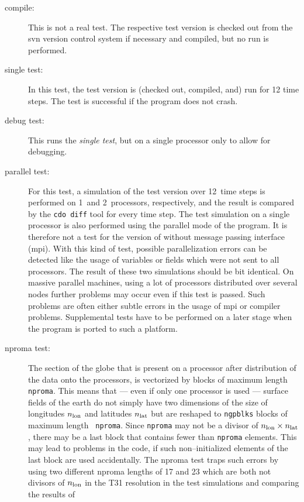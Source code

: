 \begin{description}
\item[compile:] This is not a real test. The respective test version is
  checked out from the svn version control system if necessary and
  compiled, but no run is performed. 
\item[single test:] In this test, the test version is (checked out,
  compiled, and) run for 12 time
  steps. The test is successful if the program does not crash.
\item[debug test:] This runs the \emph{single test}, but on a single processor
  only to allow for debugging.
\item[parallel test:] For this test, a simulation of the test \echam{}
  version over
  12~time steps is performed on 1~and 2~processors, respectively, and
  the result is compared by the {\tt cdo diff}
  tool for every time step. The test simulation on a single processor
  is also performed using the 
  parallel mode of the program. It is therefore not a test for the
  version of \echam{} without message passing interface (mpi). With this
  kind of test, possible parallelization errors can be detected like
  the usage of variables or fields which were not sent to all
  processors. The result of these two simulations should be bit
  identical. On massive parallel machines, using a lot of processors
  distributed over several nodes further problems may occur
  even if this test is passed. Such problems are often either subtle
  errors in the usage of mpi or compiler problems. Supplemental tests
  have to be performed on a later stage when the program is ported to
  such a platform.
\item[nproma test:] The section of the globe that is present on a
  processor after distribution of the data onto the processors, is
  vectorized by blocks of maximum length {\tt nproma}. This means that ---
  even if only one processor is used --- surface fields of the earth do not
  simply have two dimensions of the size of longitudes $n_{\rm lon}$
  and latitudes $n_{\rm lat}$
  but are reshaped to {\tt ngpblks} blocks of maximum length {\tt
    nproma}. Since {\tt nproma} may not be a divisor of $n_{\rm
    lon}\times n_{\rm lat}$, there may be a last block that contains fewer than
  {\tt nproma} elements. This may lead to problems in the code, if
  such non--initialized elements of the last block are
  used accidentally. The nproma test traps such errors by using two different
  nproma lengths of 17 and 23 which are both not divisors of $n_{\rm
    lon}$ in the T31
  resolution in the test simulations and comparing the results of

\end{description}
